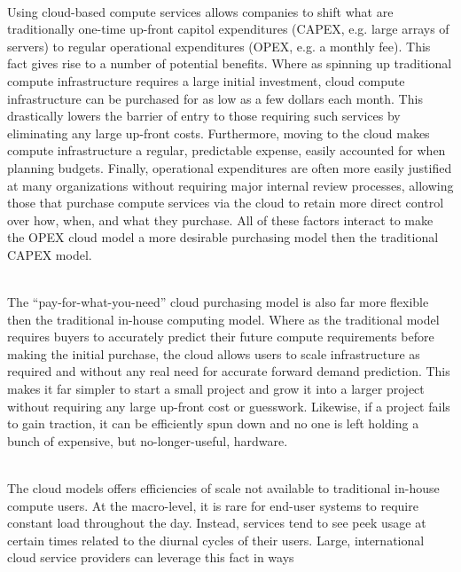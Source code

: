 \begin{packed_desc}
\item[OPEX vs CAPEX] \hfill \\ Using cloud-based compute services
  allows companies to shift what are traditionally one-time up-front
  capitol expenditures (CAPEX, e.g. large arrays of servers) to
  regular operational expenditures (OPEX, e.g. a monthly fee). This
  fact gives rise to a number of potential benefits. Where as spinning
  up traditional compute infrastructure requires a large initial
  investment, cloud compute infrastructure can be purchased for as low
  as a few dollars each month. This drastically lowers the barrier of
  entry to those requiring such services by eliminating any large
  up-front costs. Furthermore, moving to the cloud makes compute
  infrastructure a regular, predictable expense, easily accounted for
  when planning budgets. Finally, operational expenditures are often
  more easily justified at many organizations without requiring major
  internal review processes, allowing those that purchase compute
  services via the cloud to retain more direct control over how, when,
  and what they purchase. All of these factors interact to make the
  OPEX cloud model a more desirable purchasing model then the
  traditional CAPEX model.
\item[Flexibility] \hfill \\ The ``pay-for-what-you-need'' cloud
  purchasing model is also far more flexible then the traditional
  in-house computing model. Where as the traditional model requires
  buyers to accurately predict their future compute requirements
  before making the initial purchase, the cloud allows users to scale
  infrastructure as required and without any real need for accurate
  forward demand prediction. This makes it far simpler to start a
  small project and grow it into a larger project without requiring
  any large up-front cost or guesswork. Likewise, if a project fails
  to gain traction, it can be efficiently spun down and no one is left
  holding a bunch of expensive, but no-longer-useful, hardware.
\item[Efficiency] \hfill \\ The cloud models offers efficiencies of
  scale not available to traditional in-house compute users. At the
  macro-level, it is rare for end-user systems to require constant
  load throughout the day. Instead, services tend to see peek usage at
  certain times related to the diurnal cycles of their users. Large,
  international cloud service providers can leverage this fact in ways

\end{packed_desc}
